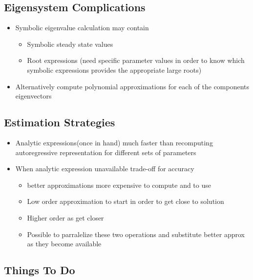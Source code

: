 \documentclass[12pt]{article}
\begin{document}
  \subsection{Eigensystem Complications}
  \begin{itemize}
  \item Symbolic eigenvalue calculation may contain
    \begin{itemize}
    \item Symbolic steady state values
    \item Root expressions (need specific parameter values in order to know which symbolic expressions provides the appropriate large roots)
    \end{itemize}
  \item Alternatively compute polynomial approximations 
for each of the components eigenvectors
  \end{itemize}







  \subsection{Estimation Strategies }
  \begin{itemize}
  \item Analytic expressions(once in hand) much faster than recomputing autoregressive representation for different sets of parameters

  \item When analytic expression unavailable trade-off for accuracy
    \begin{itemize}
    \item better approximations more expensive to compute and to use
    \item Low order approximation to start in order to get close to solution
    \item Higher order as get closer
    \item Possible to parralelize these two operations and substitute better approx as they become available
    \end{itemize}
  \end{itemize}







  \subsection{Things To Do}
\end{document}
